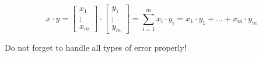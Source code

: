 \begin{itemize}
  \begin{equation*}
    x \cdot y = \begin{bmatrix} x_1 \\ \vdots \\ x_m\end{bmatrix} 
    \cdot 
    \begin{bmatrix} y_1 \\ \vdots \\ y_m\end{bmatrix} = 
    \sum_{i = 1}^{m} x_i \cdot y_i =  x_1 \cdot y_1 + \dots + x_m \cdot y_m 
  \end{equation*}
\end{itemize}

Do not forget to handle all types of error properly!



